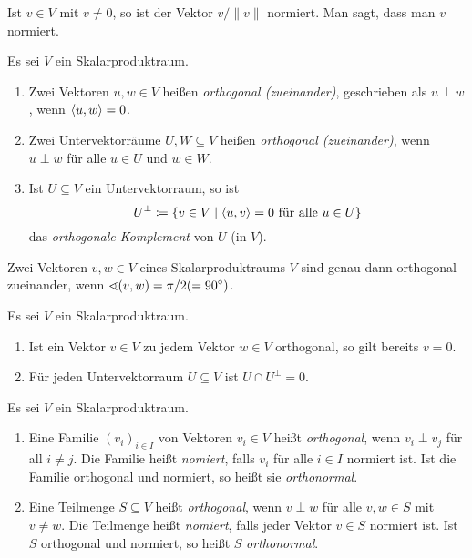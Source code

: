 \begin{remark}
  Ist $v \in V$ mit $v \neq 0$, so ist der Vektor $v/\|v\|$ normiert.
  Man sagt, dass man $v$ normiert.
\end{remark}


\begin{definition}
  Es sei $V$ ein Skalarproduktraum.
  \begin{enumerate}[leftmargin=*, label=\roman*)]
    \item
      Zwei Vektoren $u, w \in V$ heißen \emph{orthogonal (zueinander)}, geschrieben als $u \perp w$, wenn $\left\langle u, w \right\rangle = 0$.
    \item
      Zwei Untervektorräume $U, W \subseteq V$ heißen \emph{orthogonal (zueinander)}, wenn $u \perp w$ für alle $u \in U$ und $w \in W$.
    \item
      Ist $U \subseteq V$ ein Untervektorraum, so ist
      \[
        U^\perp
        \coloneqq
        \{
          v \in V
          \mid
          \text{$\left\langle u, v \right\rangle = 0$ für alle $u \in U$}
        \}
      \]
      das \emph{orthogonale Komplement} von $U$ (in $V$).
  \end{enumerate}
\end{definition}


\begin{remark}
  Zwei Vektoren $v, w \in V$ eines Skalarproduktraums $V$ sind genau dann orthogonal zueinander, wenn $\sphericalangle(v,w) = \pi/2 ( = {90}^\circ )$.
\end{remark}


\begin{lemma}
  Es sei $V$ ein Skalarproduktraum.
  \begin{enumerate}[leftmargin=*, label=\roman*)]
    \item
      Ist ein Vektor $v \in V$ zu jedem Vektor $w \in V$ orthogonal, so gilt bereits $v = 0$.
    \item
      Für jeden Untervektorraum $U \subseteq V$ ist $U \cap U^\perp = 0$.
  \end{enumerate}
\end{lemma}


\begin{definition}
  Es sei $V$ ein Skalarproduktraum.
  \begin{enumerate}[leftmargin=*, label=\roman*)]
    \item
      Eine Familie $(v_i)_{i \in I}$ von Vektoren $v_i \in V$ heißt \emph{orthogonal}, wenn $v_i \perp v_j$ für all $i \neq j$.
      Die Familie heißt \emph{nomiert}, falls $v_i$ für alle $i \in I$ normiert ist.
      Ist die Familie orthogonal und normiert, so heißt sie \emph{orthonormal}.
    \item
      Eine Teilmenge $S \subseteq V$ heißt \emph{orthogonal}, wenn $v \perp w$ für alle $v, w \in S$ mit $v \neq w$.
      Die Teilmenge heißt \emph{nomiert}, falls jeder Vektor $v \in S$ normiert ist.
      Ist $S$ orthogonal und normiert, so heißt $S$ \emph{orthonormal}.
  \end{enumerate}
\end{definition}



